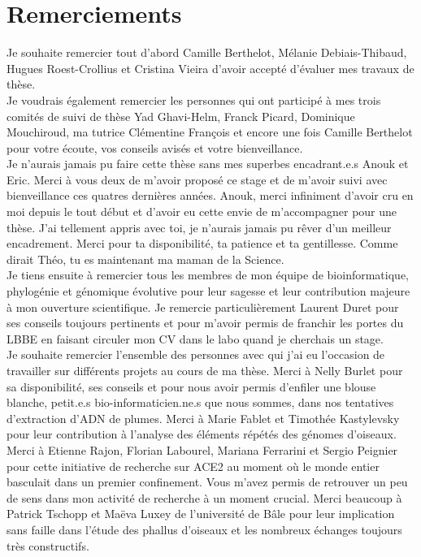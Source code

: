 \chapter*{Remerciements}
\label{remerciements}

Je souhaite remercier tout d’abord Camille Berthelot, Mélanie Debiais-Thibaud, Hugues Roest-Crollius et Cristina Vieira d’avoir accepté d’évaluer mes travaux de thèse.\\

Je voudrais également remercier les personnes qui ont participé à mes trois comités de suivi de thèse Yad Ghavi-Helm, Franck Picard, Dominique Mouchiroud, ma tutrice Clémentine François et encore une fois Camille Berthelot pour votre écoute, vos conseils avisés et votre bienveillance.\\

Je n'aurais jamais pu faire cette thèse sans mes superbes encadrant.e.s Anouk et Eric. Merci à vous deux de m'avoir proposé ce stage et de m'avoir suivi avec bienveillance ces quatres dernières années. Anouk, merci infiniment d'avoir cru en moi depuis le tout début et d'avoir eu cette envie de m'accompagner pour une thèse. J'ai tellement appris avec toi, je n'aurais jamais pu rêver d'un meilleur encadrement. Merci pour ta disponibilité, ta patience et ta gentillesse. Comme dirait Théo, tu es maintenant ma maman de la Science. \\

Je tiens ensuite à remercier tous les membres de mon équipe de bioinformatique, phylogénie et génomique évolutive pour leur sagesse et leur contribution majeure à mon ouverture scientifique. Je remercie particulièrement Laurent Duret pour ses conseils toujours pertinents et pour m’avoir permis de franchir les portes du LBBE en faisant circuler mon CV dans le labo quand je cherchais un stage.\\

Je souhaite remercier l’ensemble des personnes avec qui j’ai eu l’occasion de travailler sur différents projets au cours de ma thèse. Merci à Nelly Burlet pour sa disponibilité, ses conseils et pour nous avoir permis d’enfiler une blouse blanche, petit.e.s bio-informaticien.ne.s que nous sommes, dans nos tentatives d’extraction d’ADN de plumes. Merci à Marie Fablet et Timothée Kastylevsky pour leur contribution à l’analyse des éléments répétés des génomes d’oiseaux. Merci à Etienne Rajon, Florian Labourel, Mariana Ferrarini et Sergio Peignier pour cette initiative de recherche sur ACE2 au moment où le monde entier basculait dans un premier confinement. Vous m’avez permis de retrouver un peu de sens dans mon activité de recherche à un moment crucial. Merci beaucoup à Patrick Tschopp et Maëva Luxey de l'université de Bâle pour leur implication sans faille dans l'étude des phallus d'oiseaux et les nombreux échanges toujours très constructifs. \\

